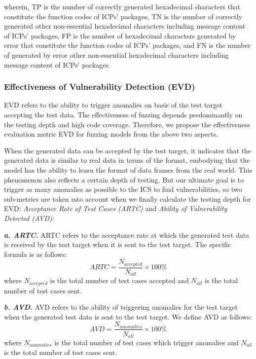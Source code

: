 wherein, TP is the number of correctly generated hexadecimal characters that constitute the function codes of ICPs' packages, TN is the number of correctly generated other non-essential hexadecimal characters including message content of ICPs' packages, FP is the number of hexadecimal characters  generated by error that constitute the function codes of ICPs' packages, and FN is the number of generated by error other non-essential hexadecimal characters including message content of ICPs' packages.

\subsubsection{\textbf{Effectiveness of Vulnerability Detection (EVD)}}
EVD refers to the ability to trigger anomalies on basis of the test target accepting the test data. The effectiveness of fuzzing depends predominantly on the testing depth and high code coverage. Therefore, we propose the effectiveness evaluation metric EVD for fuzzing models from the above two aspects.

When the generated data can be accepted by the test target, it indicates that the generated data is similar to real data in terms of the format, embodying that the model has the ability to learn the format of data frames from the real world. This phenomenon also reflects a certain depth of testing. But our ultimate goal is to trigger as many anomalies as possible to the ICS to find vulnerabilities, so two sub-metrics are taken into account when we finally calculate the testing depth for EVD: \textit{Acceptance Rate of Test Cases (ARTC)} and \textit{Ability of Vulnerability Detected (AVD)}:

\quad \textit{\textbf{a. ARTC.}} ARTC refers to the acceptance rate at which the generated test data is received by the test target when it is sent to the test target. The specific formula is as follows:
\begin{equation}
ARTC = \frac{{N_{accepted}}}{{N_{all}}} \times 100\%  
\end{equation}
where ${N_{accepted}}$ is the total number of test cases accepted and ${N_{all}}$ is the total number of test cases sent.

\quad \textit{\textbf{b. AVD.}} AVD refers to the ability of triggering anomalies for the test target when the generated test data is sent to the test target. We define AVD as follows:
\begin{equation}
AVD = \frac{{N_{anomalies}}}{{N_{all}}} \times 100\%  
\end{equation}
where ${N_{anomalies}}$ is the total number of test cases which trigger anomalies and ${N_{all}}$ is the total number of test cases sent.

